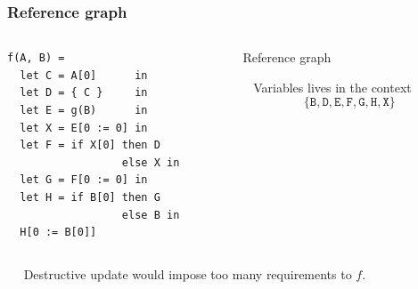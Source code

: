 \documentclass{beamer}
\newcommand{\cl}[1]{\texttt{#1}}
\begin{document}
\begin{frame}[fragile]
\frametitle{Reference graph}
\begin{columns}
\begin{column}{0.5\textwidth}
\begin{lstlisting}
f(A, B) =
  let C = A[0]      in
  let D = { C }     in
  let E = g(B)      in
  let X = E[0 := 0] in
  let F = if X[0] then D
                  else X in
  let G = F[0 := 0] in
  let H = if B[0] then G
                  else B in
  H[0 := B[0]]
\end{lstlisting}
\end{column}
\begin{column}{0.5\textwidth}
Reference graph
\begin{center}
\end{center}
\ \newline
Variables lives in the context
$$\{ \cl{B}, \cl{D}, \cl{E}, \cl{F}, \cl{G}, \cl{H}, \cl{X} \}$$
\end{column}
\end{columns}
\ \newline \ \newline
Destructive update would impose too many requirements to $f$.
\end{frame}
\end{document}
